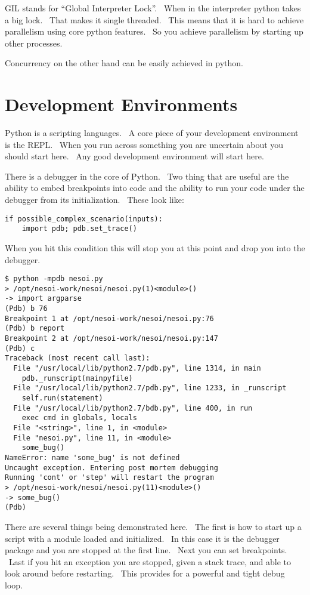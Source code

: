 \documentclass[]{article}
\begin{document}
GIL stands for ``Global Interpreter Lock''. ~When in the interpreter
python takes a big lock. ~That makes it single threaded. ~This means
that it is hard to achieve parallelism using core python features. ~So
you achieve parallelism by starting up other processes.

Concurrency on the other hand can be easily achieved in python.

\section{Development Environments}

Python is a scripting languages. ~A core piece of your development
environment is the REPL. ~When you run across something you are
uncertain about you should start here. ~Any good development environment
will start here.

There is a debugger in the core of Python. ~Two thing that are useful
are the ability to embed breakpoints into code and the ability to run
your code under the debugger from its initialization. ~These look like:

\begin{verbatim}
if possible_complex_scenario(inputs):
    import pdb; pdb.set_trace()
\end{verbatim}

When you hit this condition this will stop you at this point and drop
you into the debugger.

\begin{verbatim}
$ python -mpdb nesoi.py
> /opt/nesoi-work/nesoi/nesoi.py(1)<module>()
-> import argparse
(Pdb) b 76
Breakpoint 1 at /opt/nesoi-work/nesoi/nesoi.py:76
(Pdb) b report
Breakpoint 2 at /opt/nesoi-work/nesoi/nesoi.py:147
(Pdb) c
Traceback (most recent call last):
  File "/usr/local/lib/python2.7/pdb.py", line 1314, in main
    pdb._runscript(mainpyfile)
  File "/usr/local/lib/python2.7/pdb.py", line 1233, in _runscript
    self.run(statement)
  File "/usr/local/lib/python2.7/bdb.py", line 400, in run
    exec cmd in globals, locals
  File "<string>", line 1, in <module>
  File "nesoi.py", line 11, in <module>
    some_bug()
NameError: name 'some_bug' is not defined
Uncaught exception. Entering post mortem debugging
Running 'cont' or 'step' will restart the program
> /opt/nesoi-work/nesoi/nesoi.py(11)<module>()
-> some_bug()
(Pdb) 
\end{verbatim}

There are several things being demonstrated here. ~The first is how to
start up a script with a module loaded and initialized. ~In this case it
is the debugger package and you are stopped at the first line. ~Next you
can set breakpoints. ~Last if you hit an exception you are stopped,
given a stack trace, and able to look around before restarting. ~This
provides for a powerful and tight debug loop.
\end{document}
